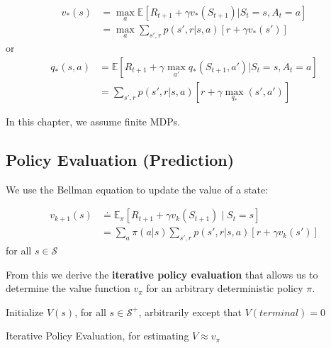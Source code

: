 \documentclass[11pt]{article}
\begin{document}
\begin{equation}
\begin{aligned}
v_*(s) &= \max_{a} \mathbb{E}[R_{t+1} + \gamma v_*(S_{t+1}) | S_t = s, A_t = a]\\
       &= \max_{a} \sum\limits_{s',r} p(s',r|s,a)[r+\gamma v_*(s')]
\end{aligned}
\end{equation}
or
\begin{equation}
\begin{aligned}
q_*(s,a) &= \mathbb{E}[R_{t+1} + \gamma \max_{a'} q_*(S_{t+1}, a') | S_t = s, A_t = a]\\
       &= \sum\limits_{s',r} p(s',r|s,a)[r+\gamma \max_{q_*}(s',a')]
\end{aligned}
\end{equation}

In this chapter, we assume finite MDPs.

\subsection{Policy Evaluation (Prediction)}
\label{sec:orgef0a72e}

We use the Bellman equation to update the value of a state:

\begin{equation}
\begin{aligned}
v_{k+1}(s) &\doteq \mathbb{E}_{\pi} \left[ R_{t+1} + \gamma v_{k}(S_{t+1}) \mid S_{t} = s \right] \\
           &= \sum\limits_{a} \pi(a|s) \sum\limits_{s',r} p(s',r|s,a) \left[ r + \gamma v_{k}(s') \right]
\end{aligned}
\end{equation}
for all \(s \in \mathcal{S}\)

From this we derive the \textbf{iterative policy evaluation} that allows us to determine
the value function \(v_{\pi}\) for an arbitrary deterministic policy \(\pi\).
\newline
\newline
\begin{algorithm}[H]

  Initialize $V(s)$, for all $s \in \mathcal{S}^{+}$, arbitrarily except that $V(terminal)=0$
  \newline


\caption{Iterative Policy Evaluation, for estimating $V \approx v_{\pi}$}
\end{algorithm}
\end{document}
